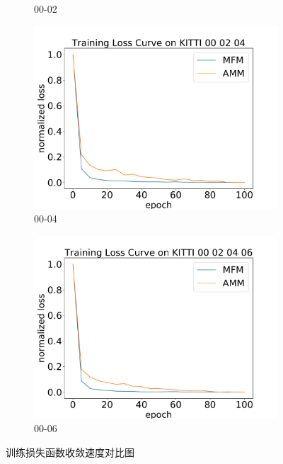 \begin{figure}[ht]
\begin{subfigure}[c]{0.48\textwidth}
        \caption{00-02}
        \label{fig:tl_02}
    \end{subfigure}
    \vspace*{2mm}
    \begin{subfigure}[c]{0.48\textwidth}
        \includegraphics[width=\textwidth]{datavo/training_loss_0-4.pdf} 
        \caption{00-04}
        \label{fig:tl_024}
    \end{subfigure}
    \begin{subfigure}[c]{0.48\textwidth}
        \includegraphics[width=\textwidth]{datavo/training_loss_0-6.pdf} 
        \caption{00-06}
        \label{fig:tl_0246}
    \end{subfigure}
    \caption{训练损失函数收敛速度对比图}
    {\label{fig:training_loss}}
\end{figure}


